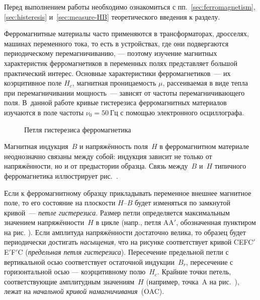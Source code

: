 \label{lab:4-5}



Перед выполнением работы необходимо ознакомиться с
пп.~\ref{sec:ferromagnetism}, \ref{sec:histeresis} и~\ref{sec:measure-HB} 
теоретического введения к разделу.


Ферромагнитные материалы часто применяются в трансформаторах, дросселях, машинах
переменного тока, то есть в устройствах, где они подвергаются периодическому
перемагничиванию, --- поэтому изучение магнитных характеристик 
ферромагнетиков в переменных полях представляет большой практический интерес. 
Основные характеристики ферромагнетиков~--- их коэрцитивное поле
$H_c$, магнитная проницаемость $\mu$, 
рассеиваемая в виде тепла при перемагничивании мощность~--- зависят
от частоты перемагничивающего поля. В~данной работе
кривые гистерезиса ферромагнитных материалов изучаются в поле частоты
$\nu_0 = 50~Гц$ с помощью электронного осциллографа.

\begin{figure}[h!]
    \centering\small
    \caption{Петля гистерезиса ферромагнетика}
\end{figure}

Магнитная индукция~${B}$ и напряжённость поля~${H}$ в ферромагнитном материале 
неоднозначно связаны между собой: индукция зависит не только от напряжённости, 
но и от предыстории образца. Связь между~$B$ и~$H$ типичного ферромагнетика 
иллюстрирует рис.~.


Если к ферромагнитному образцу прикладывать переменное внешнее магнитное поле,
то его состояние на плоскости $H$--$B$ будет изменяться по замкнутой кривой~---
\emph{петле гистерезиса}. Размер петли определяется максимальным
значением напряжённости~$H$ в цикле (напр.,
петля AA$'$, обозначенная пунктиром на рис. ). 
Если амплитуда напряжённости достаточно
велика, то образец будет периодически достигать \emph{насыщения}, 
что на рисунке соответствует кривой CEFC$'$E$'$F$'$C
(\emph{предельная петля гистерезиса}).
Пересечение предельной петли с вертикальной осью соответствует
остаточной индукции~$B_r$, пересечение с горизонтальной осью ---
коэрцитивному полю~$H_c$.
Крайние точки петель, соответствующие амплитудным значениям~$H$ 
(например, точка~A на рис.~), лежат на 
\emph{начальной кривой намагничивания}~(OAC).

